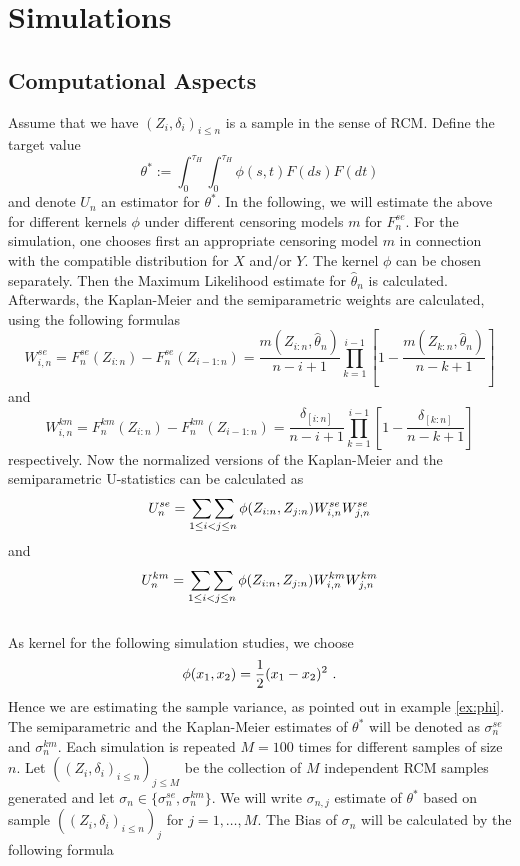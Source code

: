 \chapter{Simulations} \label{ch:simulation}

\section{Computational Aspects}
Assume that we have $(Z_i, \delta_i)_{i\leq n}$ is a sample in the sense of RCM. Define the target value 
$$\theta^* := \int_{0}^{\tau_H}\int_{0}^{\tau_H} \phi(s,t) F(ds)F(dt)$$
and denote $U_n$ an estimator for $\theta^*$. In the following, we will estimate the above for different kernels $\phi$ under different censoring models $m$ for $F_n^{se}$. For the simulation, one chooses first an appropriate censoring model $m$ in connection with the compatible distribution for $X$ and/or $Y$. The kernel $\phi$ can be chosen separately. Then the Maximum Likelihood estimate for $\hat\theta_n$ is calculated. Afterwards, the Kaplan-Meier and the semiparametric weights are calculated, using the following formulas
$$W_{i,n}^{se} = F_n^{se}(Z_{i:n}) - F_n^{se}(Z_{i-1:n}) = \frac{m(Z_{i:n},\hat\theta_n)}{n-i+1} \prod\limits_{k=1}^{i-1}\left[1-\frac{m(Z_{k:n},\hat\theta_n)}{n-k+1}\right]$$
and 
$$W_{i,n}^{km} = F_n^{km}(Z_{i:n}) - F_n^{km}(Z_{i-1:n}) = \frac{\delta_{[i:n]}}{n-i+1} \prod\limits_{k=1}^{i-1}\left[1-\frac{\delta_{[k:n]}}{n-k+1}\right]$$
respectively. Now the normalized versions of the Kaplan-Meier and the semiparametric U-statistics can be calculated as
$$U_n^{se} = \mathop{\sum\sum}\limits_{1\leq i < j \leq n} \phi(Z_{i:n}, Z_{j:n}) W_{i,n}^{se} W_{j,n}^{se}$$
and 
$$U_n^{km} = \mathop{\sum\sum}\limits_{1\leq i < j \leq n} \phi(Z_{i:n}, Z_{j:n}) W_{i,n}^{km} W_{j,n}^{km}$$
\\
As kernel for the following simulation studies, we choose 
$$\phi(x_1,x_2) = \frac{1}{2} (x_1 - x_2)^2\textrm{ .}$$
Hence we are estimating the sample variance, as pointed out in example \ref{ex:phi}. The semiparametric and the Kaplan-Meier estimates of $\theta^*$ will be denoted as $\sigma_{n}^{se}$ and $\sigma_{n}^{km}$. Each simulation is repeated $M = 100$ times for different samples of size $n$. Let $((Z_i, \delta_i)_{i\leq n})_{j\leq M}$ be the collection of $M$ independent RCM samples generated and let $\sigma_n \in \{\sigma_n^{se}, \sigma_n^{km}\}$. We will write $\sigma_{n,j}$ estimate of $\theta^*$ based on sample $((Z_i, \delta_i)_{i\leq n})_j$ for $j=1,\dots,M$. The Bias of $\sigma_n$ will be calculated by the following formula
